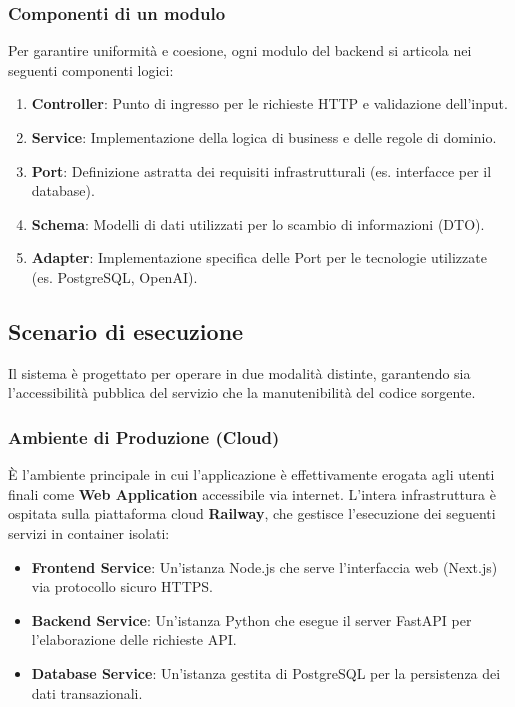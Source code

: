 \documentclass[a4paper, 11pt, oneside]{scrartcl}
\begin{document}
\subsubsection{Componenti di un modulo}
Per garantire uniformità e coesione, ogni modulo del backend si articola nei seguenti componenti logici:
\begin{enumerate}
    \item \textbf{Controller}: Punto di ingresso per le richieste HTTP e validazione dell'input.
    \item \textbf{Service}: Implementazione della logica di business e delle regole di dominio.
    \item \textbf{Port}: Definizione astratta dei requisiti infrastrutturali (es. interfacce per il database).
    \item \textbf{Schema}: Modelli di dati utilizzati per lo scambio di informazioni (DTO).
    \item \textbf{Adapter}: Implementazione specifica delle Port per le tecnologie utilizzate (es. PostgreSQL, OpenAI).
\end{enumerate}

\subsection{Scenario di esecuzione}
Il sistema è progettato per operare in due modalità distinte, garantendo sia l'accessibilità pubblica del servizio che la manutenibilità del codice
      sorgente.

\subsubsection{Ambiente di Produzione (Cloud)}
È l'ambiente principale in cui l'applicazione è effettivamente erogata agli utenti finali come \textbf{Web Application} accessibile via internet.
      L'intera infrastruttura è ospitata sulla piattaforma cloud \textbf{Railway}, che gestisce l'esecuzione dei seguenti servizi in container isolati:
\begin{itemize}
    \item \textbf{Frontend Service}: Un'istanza Node.js che serve l'interfaccia web (Next.js) via protocollo sicuro HTTPS.
    \item \textbf{Backend Service}: Un'istanza Python che esegue il server FastAPI per l'elaborazione delle richieste API.
    \item \textbf{Database Service}: Un'istanza gestita di PostgreSQL per la persistenza dei dati transazionali.
\end{itemize}
\end{document}
